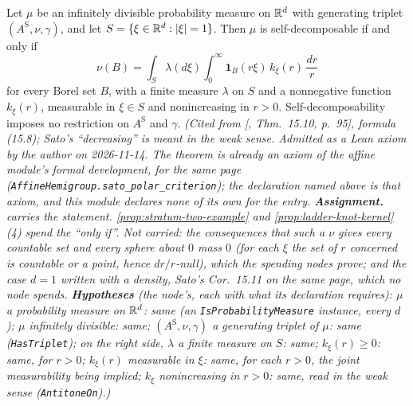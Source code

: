 \begin{theorem}
\label{thm:cited-A45}
\leanok
{}
Let $\mu$ be an infinitely divisible probability measure on $\mathbb{R}^d$ with generating triplet
$(A^{\mathrm S}, \nu, \gamma)$, and let $S = \{\xi \in \mathbb{R}^d : |\xi| = 1\}$. Then $\mu$ is self-decomposable if
and only if
\[
  \nu(B) = \int_S\lambda(d\xi)\int_0^\infty\mathbf{1}_B(r\xi)\,k_\xi(r)\,\frac{dr}{r}
\]
for every Borel set $B$, with a finite measure $\lambda$ on $S$ and a nonnegative function
$k_\xi(r)$, measurable in $\xi \in S$ and nonincreasing in $r > 0$. Self-decomposability imposes no
restriction on $A^{\mathrm S}$ and $\gamma$.
\statusA\quad{}\quad\emph{(Cited from [, Thm.~15.10, p.~95], formula
(15.8); Sato's ``decreasing'' is meant in the weak sense. Admitted as a Lean axiom by the author on
2026-11-14. The theorem is already an axiom of the affine module's formal development, for the same
page (\texttt{AffineHemigroup.sato\_polar\_criterion}); the declaration named above is that axiom,
and this module declares none of its own for the entry. \textbf{Assignment.}  carries the statement.
\ref{prop:stratum-two-example} and \ref{prop:ladder-knot-kernel}(4) spend the ``only if''. Not
carried: the consequences that such a $\nu$ gives every countable set and every sphere about $0$
mass $0$ (for each $\xi$ the set of $r$ concerned is countable or a point, hence $dr/r$-null), which
the spending nodes prove; and the case $d = 1$ written with a density, Sato's Cor.~15.11 on the same
page, which no node spends.
\textbf{Hypotheses} (the node's, each with what its declaration requires): $\mu$ a probability measure
on $\mathbb{R}^d$: same (an \texttt{IsProbabilityMeasure} instance, every $d$); $\mu$ infinitely
divisible: same; $(A^{\mathrm S}, \nu, \gamma)$ a generating triplet of $\mu$: same (\texttt{HasTriplet}); on
the right side, $\lambda$ a finite measure on $S$: same; $k_\xi(r) \ge 0$: same, for $r > 0$;
$k_\xi(r)$ measurable in $\xi$: same, for each $r > 0$, the joint measurability being implied;
$k_\xi$ nonincreasing in $r > 0$: same, read in the weak sense (\texttt{AntitoneOn}).)}
\end{theorem}

